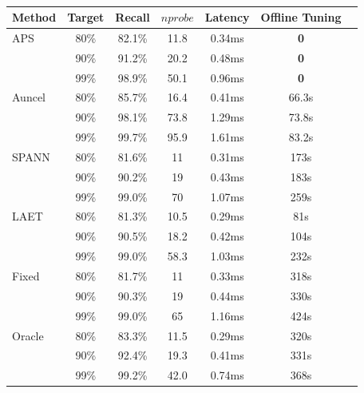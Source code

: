 \begin{table}[h]
\footnotesize
\centering
\caption{}
\label{tab:early_term}
\begin{tabular}{lcccccc}
\toprule
Method & Target & Recall & $nprobe$ & Latency & Offline Tuning \\
\midrule
APS         & 80\% & 82.1\% & 11.8 & 0.34ms & \textbf{0} \\
            & 90\% & 91.2\% & 20.2 & 0.48ms & \textbf{0} \\
            & 99\% & 98.9\% & 50.1 & 0.96ms & \textbf{0} \\
\addlinespace
Auncel \cite{zhang2023fast}      & 80\% & 85.7\% & 16.4 & 0.41ms & 66.3s \\
            & 90\% & 98.1\% & 73.8 & 1.29ms & 73.8s \\
            & 99\% & 99.7\% & 95.9 & 1.61ms & 83.2s \\
\addlinespace
SPANN \cite{chen_spann_nodate}      & 80\% & 81.6\% & 11  & 0.31ms & 173s \\ 
            & 90\% & 90.2\% & 19  & 0.43ms & 183s \\
            & 99\% & 99.0\% & 70  & 1.07ms & 259s \\
\addlinespace
LAET \cite{li2020improving}       & 80\% & 81.3\% & 10.5 & 0.29ms & 81s \\
            & 90\% & 90.5\% & 18.2 & 0.42ms & 104s \\
            & 99\% & 99.0\% & 58.3 & 1.03ms & 232s \\
\addlinespace
Fixed & 80\% & 81.7\% & 11  & 0.33ms & 318s \\
            & 90\% & 90.3\% & 19  & 0.44ms & 330s \\
            & 99\% & 99.0\% & 65  & 1.16ms & 424s \\
\addlinespace
Oracle      & 80\% & 83.3\% & 11.5 & 0.29ms & 320s \\
            & 90\% & 92.4\% & 19.3 & 0.41ms & 331s \\
            & 99\% & 99.2\% & 42.0 & 0.74ms & 368s \\
\bottomrule
\end{tabular}
\end{table}

